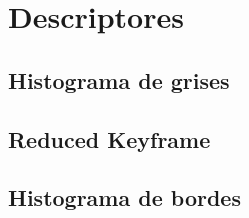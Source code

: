 \chapter{Descriptores}
\section{Histograma de grises}
\section{Reduced Keyframe}
\section{Histograma de bordes}

\lipsum[50-60]